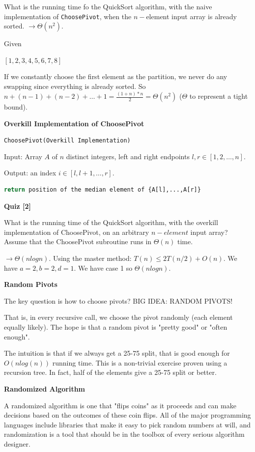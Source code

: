 \documentclass[11pt]{article}
\newcommand{\myeq}[1]{
    \vspace{11pt}
    \begin{center}
        ${#1}$
    \end{center}
    \vspace{11pt}
}
\newcommand{\boldsec}[1]{
    \vspace{11pt}
    \textbf{#1}
    \vspace{11pt}
}
\begin{document}
What is the running time fo the QuickSort algorithm, with the naive implementation of \texttt{ChoosePivot}, when the $n-$element input array is already sorted.
$\to \Theta(n^2)$.

\vspace{11pt}
Given

\myeq{[1,2,3,4,5,6,7,8]}

If we constantly choose the first element as the partition, we never do any swapping since everything is already sorted. So $n + (n-1) + (n-2) + \dots + 1 = \frac{(1+n)*n}{2} = \Theta(n^2)$ ($\Theta$ to represent a tight bound).

\boldsec{Overkill Implementation of ChoosePivot}

\texttt{ChoosePivot(Overkill Implementation)}

Input: Array $A$ of $n$ distinct integers, left and right endpoints $l, r \in [1,2,\dots,n]$.

Output: an index $i \in [l,l+1,\dots,r]$.

\vspace{11pt}
\begin{lstlisting}[language=python, breaklines=true]
return position of the median element of {A[l],...,A[r]}
\end{lstlisting}

\boldsec{Quiz [2]}

What is the running time of the QuickSort algorithm, with the overkill implementation of ChoosePivot, on an arbitrary $n-element$ input array? Assume that the ChoosePivot subroutine runs in $\Theta(n)$ time.

$\to \Theta(nlogn)$. Using the master method: $T(n) \leq 2T(n/2)+O(n)$. We have $a=2,b=2,d=1$. We have case 1 so $\Theta(nlogn)$.

\boldsec{Random Pivots}

The key question is how to choose pivots? BIG IDEA: RANDOM PIVOTS!

That is, in every recursive call, we choose the pivot randomly (each element equally likely). The hope is that a random pivot is "pretty good" or "often enough".

The intuition is that if we always get a 25-75 split, that is good enough for $O(nlog(n))$ running time. This is a non-trivial exercise proven using a recursion tree. In fact, half of the elements give a 25-75 split or better.

\boldsec{Randomized Algorithm}

A randomized algorithm is one that "flips coins" as it proceeds and can make decisions based on the outcomes of these coin flips. All of the major programming languages include libraries that make it easy to pick random numbers at will, and randomization is a tool that should be in the toolbox of every serious algorithm designer.
\end{document}
